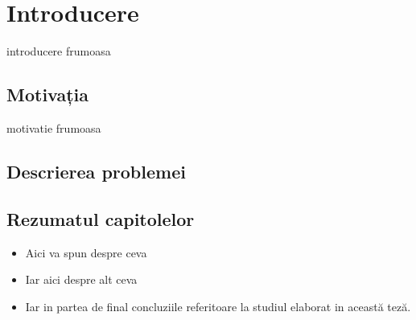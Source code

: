 \chapter{Introducere}

introducere frumoasa


\section{Motivația}

motivatie frumoasa


\section{Descrierea problemei}


	
\section{Rezumatul capitolelor}

\begin{itemize}
	\item 
	Aici va spun despre ceva
	\item
	Iar aici despre alt ceva
	\item
	Iar in partea de final concluziile referitoare la studiul elaborat in această teză.
	
\end{itemize}



